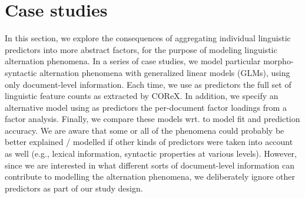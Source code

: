 \section{Case studies}
In this section, we explore the consequences of aggregating individual linguistic predictors into more abstract factors, for the purpose of modeling linguistic alternation phenomena. In a series of case studies, we model particular morpho-syntactic alternation phenomena with generalized linear models (GLMs), using only document-level information. Each time, we use as predictors the full set of linguistic feature counts as extracted by COReX. In addition, we specify an alternative model using as predictors the per-document factor loadings from a factor analysis. Finally, we compare these models wrt. to model fit and prediction accuracy. 
We are aware that some or all of the phenomena could probably be better explained / modelled if other kinds of predictors were taken into account as well (e.g., lexical information, syntactic properties at various levels). However, since we are interested in what different sorts of document-level information can contribute to modelling the alternation phenomena, we deliberately ignore other predictors as part of our study design.

